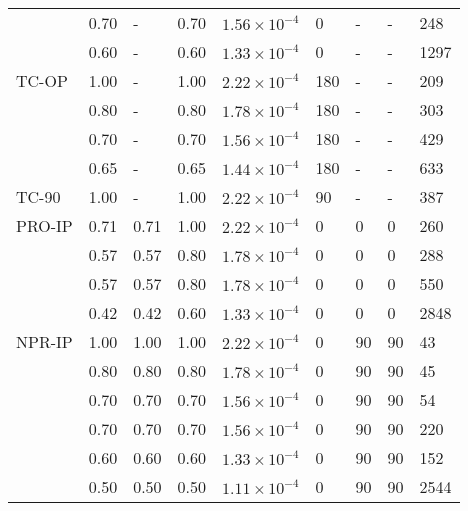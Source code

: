 \begin{table*}[htbp]
\begin{tabular}{p{2cm}p{1.2cm}p{1.2cm}p{1.2cm}p{2.5cm}p{1cm}p{1cm}p{1cm}p{1cm}}
          & 0.70  & -     & 0.70  & $1.56\times 10^{-4}$ & 0     & -     & -     & 248 \\
          & 0.60  & -     & 0.60  & $1.33\times 10^{-4}$ & 0     & -     & -     & 1297 \\
    \hline
    TC-OP & 1.00  & -     & 1.00  & $2.22\times 10^{-4}$ & 180   & -     & -     & 209 \\
          & 0.80  & -     & 0.80  & $1.78\times 10^{-4}$ & 180   & -     & -     & 303 \\
          & 0.70  & -     & 0.70  & $1.56\times 10^{-4}$ & 180   & -     & -     & 429 \\
          & 0.65  & -     & 0.65  & $1.44\times 10^{-4}$ & 180   & -     & -     & 633 \\
    \hline
    TC-90 & 1.00  & -     & 1.00  & $2.22\times 10^{-4}$ & 90    & -     & -     & 387 \\
    \hline
    PRO-IP & 0.71  & 0.71  & 1.00  & $2.22\times 10^{-4}$ & 0     & 0     & 0     & 260 \\
          & 0.57  & 0.57  & 0.80  & $1.78\times 10^{-4}$ & 0     & 0     & 0     & 288 \\
          & 0.57  & 0.57  & 0.80  & $1.78\times 10^{-4}$ & 0     & 0     & 0     & 550 \\
          & 0.42  & 0.42  & 0.60  & $1.33\times 10^{-4}$ & 0     & 0     & 0     & 2848 \\
    \hline
    NPR-IP & 1.00  & 1.00  & 1.00  & $2.22\times 10^{-4}$ & 0     & 90    & 90    & 43 \\
          & 0.80  & 0.80  & 0.80  & $1.78\times 10^{-4}$ & 0     & 90    & 90    & 45 \\
          & 0.70  & 0.70  & 0.70  & $1.56\times 10^{-4}$ & 0     & 90    & 90    & 54 \\
          & 0.70  & 0.70  & 0.70  & $1.56\times 10^{-4}$ & 0     & 90    & 90    & 220 \\
          & 0.60  & 0.60  & 0.60  & $1.33\times 10^{-4}$ & 0     & 90    & 90    & 152 \\
          & 0.50  & 0.50  & 0.50  & $1.11\times 10^{-4}$ & 0     & 90    & 90    & 2544 \\
    \hline
    \end{tabular}%
  \label{Tab:TestMatrix}%
\end{table*}%

